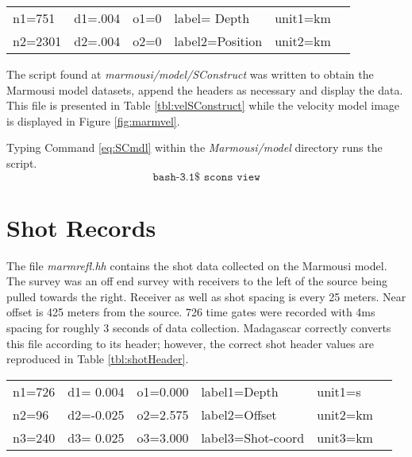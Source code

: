 {
\begin{tabular}{|llllll|}
        \hline        
    n1=751    &     d1=.004   &        o1=0  &        label= Depth     & unit1=km &  \\ 
    n2=2301   &     d2=.004   &        o2=0  &        label2=Position  & unit2=km &  \\
	\hline
\end{tabular}
}

The script found at \emph{marmousi/model/SConstruct} was written to obtain the Marmousi model datasets, append the 
headers as necessary and display the  data.  This file is presented in Table \ref{tbl:velSConstruct} while the 
velocity model image is displayed in Figure \ref{fig:marmvel}.
 
{
\tiny

\normalsize
}


Typing Command \ref{eq:SCmdl} within the \emph{Marmousi\slash model} directory runs the script.
\begin{equation}\label{eq:SCmdl} \texttt{bash-3.1\$\ scons\ view} \end{equation}


\section{Shot Records}
The file \emph{marmrefl.hh} contains the shot data collected on the Marmousi model.  The survey was an off end survey with 
receivers to the left of the source being pulled towards the right.  Receiver as well as shot spacing is every 25 meters.  
Near offset is 425 meters from the source.  726 time gates were recorded with 4ms spacing for roughly 3 seconds of data collection.  
Madagascar correctly converts this file according to its header; however, the correct shot header values are reproduced in 
Table \ref{tbl:shotHeader}.   

{
	\begin{tabular}{|llllll|}
	\hline  
	    n1=726 &  d1= 0.004   &  o1=0.000  &  label1=Depth       &   unit1=s   & \\
    	    n2=96  &  d2=-0.025   &  o2=2.575  &  label2=Offset      &   unit2=km  & \\
            n3=240 &  d3= 0.025   &  o3=3.000  &  label3=Shot-coord  &   unit3=km  & \\
	\hline
	\end{tabular}
}

